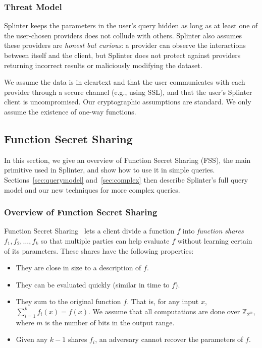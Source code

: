 \subsubsection{Threat Model}
Splinter keeps the parameters in the user's query hidden
as long as at least one of the user-chosen providers does not collude with others. 
Splinter also assumes these providers are \textit{honest but curious}: a provider can observe the interactions between
itself and the client, but 
Splinter does not protect against providers returning incorrect results or maliciously modifying the dataset.

We assume the data is in cleartext and that the user communicates with each provider through a secure channel (e.g., using SSL),
and that the user's Splinter client is uncompromised. 
Our cryptographic assumptions are standard.
We only assume the existence of one-way functions.


\subsection{Function Secret Sharing}
\label{sec:queries}
In this section, we give an overview of Function Secret Sharing (FSS),
the main primitive used in Splinter, and show how to use it in simple queries.
Sections~\ref{sec:querymodel} and~\ref{sec:complex} then describe Splinter's full
query model and our new techniques for more complex queries.

\subsubsection{Overview of Function Secret Sharing}
\label{sec:fss_overview}
Function Secret Sharing~\cite{fss} lets a client divide
a function $f$ into \textit{function shares} 
$f_1,f_2,\dots,f_k$ so that multiple parties
can help evaluate $f$ without learning certain of its parameters.
These shares have the following properties:

\begin{itemize}
	\item{They are close in size to a description of $f$.}
	\item{They can be evaluated quickly (similar in time to $f$).}
	\item{They sum to the original function $f$.
		That is, for any input $x$, $\sum\limits_{i=1}^k f_i(x) = f(x)$. We 
		assume that all computations are done over $\mathbb{Z}_{2^m}$, 
		where $m$ is the number of bits in the output range. }
	\item{Given any $k-1$ shares $f_i$, an adversary cannot recover the parameters 
		of $f$.}
\end{itemize} 

